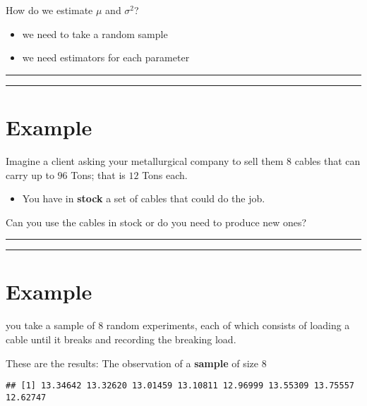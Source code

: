 \documentclass[
]{book}
\providecommand{\tightlist}{%
  \setlength{\itemsep}{0pt}\setlength{\parskip}{0pt}}
\begin{document}
How do we estimate \(\mu\) and \(\sigma^2\)?

\begin{itemize}
\item
  we need to take a random sample
\item
  we need estimators for each parameter
\end{itemize}

\begin{center}\rule{0.5\linewidth}{0.5pt}\end{center}

\begin{center}\rule{0.5\linewidth}{0.5pt}\end{center}

\hypertarget{example-13}{%
\section{Example}\label{example-13}}

Imagine a client asking your metallurgical company to sell them \(8\) cables that can carry up to \(96\) Tons; that is \(12\) Tons each.

\begin{itemize}
\tightlist
\item
  You have in \textbf{stock} a set of cables that could do the job.
\end{itemize}

Can you use the cables in stock or do you need to produce new ones?

\begin{center}\rule{0.5\linewidth}{0.5pt}\end{center}

\begin{center}\rule{0.5\linewidth}{0.5pt}\end{center}

\hypertarget{example-14}{%
\section{Example}\label{example-14}}

you take a sample of \(8\) random experiments, each of which consists of loading a cable until it breaks and recording the breaking load.

These are the results: The observation of a \textbf{sample} of size \(8\)

\begin{verbatim}
## [1] 13.34642 13.32620 13.01459 13.10811 12.96999 13.55309 13.75557 12.62747
\end{verbatim}
\end{document}

